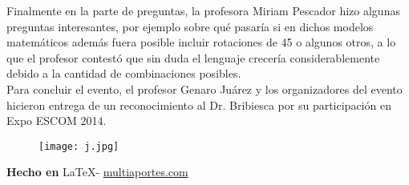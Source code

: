 \documentclass{article}
\begin{document}
{Finalmente en la parte de preguntas, la profesora Miriam Pescador hizo algunas preguntas interesantes, por ejemplo sobre qué pasaría si en dichos modelos matemáticos además fuera posible incluir rotaciones de 45 o algunos otros, a lo que el profesor contestó que sin duda el lenguaje crecería considerablemente debido a la cantidad de combinaciones posibles.
\\

Para concluir el evento, el profesor Genaro Juárez y los organizadores del evento hicieron entrega de un reconocimiento al Dr. Bribiesca por su participación en Expo ESCOM 2014.
}

\begin{figure}[h]
\centering
\texttt{[image: j.jpg]}
\end{figure}

\large{\hfill \textbf{Hecho en } \LaTeX - \url{multiaportes.com}}
\end{document}
